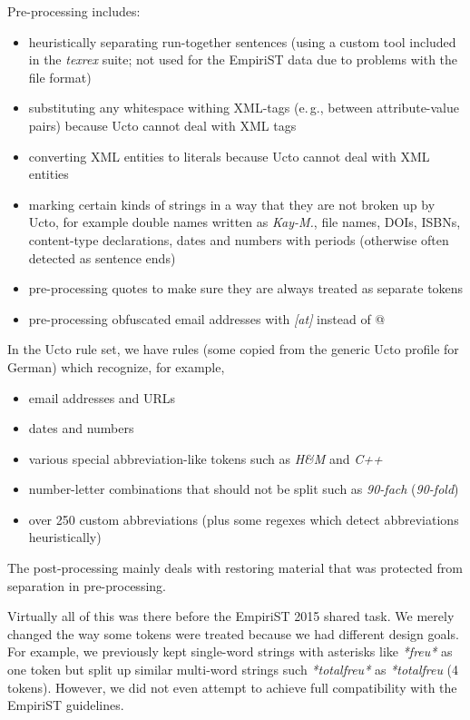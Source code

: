 \documentclass[11pt]{article}
\newcommand{\Lf}{
  \setlength{\itemsep}{1pt}
  \setlength{\parskip}{0pt}
  \setlength{\parsep}{0pt}
}
\begin{document}
Pre-processing includes:

\begin{itemize}\Lf
  \item heuristically separating run-together sentences (using a custom tool included in the \textit{texrex} suite; not used for the EmpiriST data due to problems with the file format)
  \item substituting any whitespace withing XML-tags (e.\,g., between attribute-value pairs) because Ucto cannot deal with XML tags 
  \item converting XML entities to literals because Ucto cannot deal with XML entities
  \item marking certain kinds of strings in a way that they are not broken up by Ucto, for example double names written as \textit{Kay-M.}, file names, DOIs, ISBNs, content-type declarations, dates and numbers with periods (otherwise often detected as sentence ends)
  \item pre-processing quotes to make sure they are always treated as separate tokens
  \item pre-processing obfuscated email addresses with \textit{[at]} instead of @
\end{itemize}

In the Ucto rule set, we have rules (some copied from the generic Ucto profile for German) which recognize, for example,

\begin{itemize}\Lf
  \item email addresses and URLs
  \item dates and numbers
  \item various special abbreviation-like tokens such as \textit{H\&M} and \textit{C++}
  \item number-letter combinations that should not be split such as \textit{90-fach} (\textit{90-fold})
  \item over 250 custom abbreviations (plus some regexes which detect abbreviations heuristically)
\end{itemize}

The post-processing mainly deals with restoring material that was protected from separation in pre-processing.

Virtually all of this was there before the EmpiriST 2015 shared task.
We merely changed the way some tokens were treated because we had different design goals.
For example, we previously kept single-word strings with asterisks like \textit{*freu*} as one token but split up similar multi-word strings such \textit{*total\textvisiblespace freu*} as \textit{*\textvisiblespace total\textvisiblespace freu\textvisiblespace *} (4 tokens).
However, we did not even attempt to achieve full compatibility with the EmpiriST guidelines.
\end{document}
